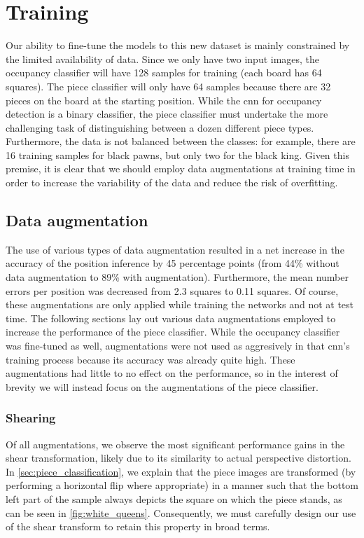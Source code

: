 \documentclass[../main.tex]{subfiles}
\begin{document}
\section{Training}
Our ability to fine-tune the models to this new dataset is mainly constrained by the limited availability of data.
Since we only have two input images, the occupancy classifier will have 128 samples for training (each board has 64 squares).
The piece classifier will only have 64 samples because there are 32 pieces on the board at the starting position.
While the \gls{cnn} for occupancy detection is a binary classifier, the piece classifier must undertake the more challenging task of distinguishing between a dozen different piece types.
Furthermore, the data is not balanced between the classes: for example, there are 16 training samples for black pawns, but only two for the black king.
Given this premise, it is clear that we should employ data augmentations at training time in order to increase the variability of the data and reduce the risk of overfitting.

\subsection{Data augmentation}
The use of various types of data augmentation resulted in a net increase in the accuracy of the position inference by 45 percentage points (from 44\% without data augmentation to 89\% with augmentation).
Furthermore, the mean number errors per position was decreased from 2.3 squares to 0.11 squares.
Of course, these augmentations are only applied while training the networks and not at test time.
The following sections lay out various data augmentations employed to increase the performance of the piece classifier.
While the occupancy classifier was fine-tuned as well, augmentations were not used as aggresively in that \gls{cnn}'s training process because its accuracy was already quite high.
These augmentations had little to no effect on the performance, so in the interest of brevity we will instead focus on the augmentations of the piece classifier.

\subsubsection{Shearing}
Of all augmentations, we observe the most significant performance gains in the shear transformation, likely due to its similarity to actual perspective distortion.
In \cref{sec:piece_classification}, we explain that the piece images are transformed (by performing a horizontal flip where appropriate) in a manner such that the bottom left part of the sample always depicts the square on which the piece stands, as can be seen in \cref{fig:white_queens}.
Consequently, we must carefully design our use of the shear transform to retain this property in broad terms.
\end{document}
